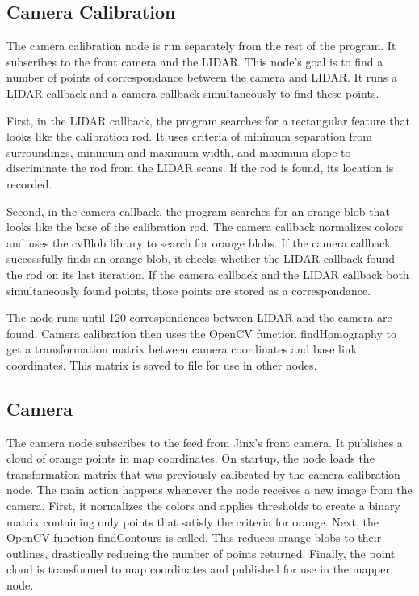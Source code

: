 \documentclass{article}
\begin{document}


\subsection{Camera Calibration}

The camera calibration node is run separately from the rest of the program.  It subscribes to the front camera and the LIDAR.  This node's goal is to find a number of points of correspondance between the camera and LIDAR.  It runs a LIDAR callback and a camera callback simultaneously to find these points.

First, in the LIDAR callback, the program searches for a rectangular feature that looks like the calibration rod.  It uses criteria of minimum separation from surroundings, minimum and maximum width, and maximum slope to discriminate the rod from the LIDAR scans.  If the rod is found, its location is recorded.

Second, in the camera callback, the program searches for an orange blob that looks like the base of the calibration rod.  The camera callback normalizes colors and uses the cvBlob library to search for orange blobs.  If the camera callback successfully finds an orange blob, it checks whether the LIDAR callback found the rod on its last iteration.  If the camera callback and the LIDAR callback both simultaneously found points, those points are stored as a correspondance.

The node runs until 120 correspondences between LIDAR and the camera are found.  Camera calibration then uses the OpenCV function findHomography to get a transformation matrix between camera coordinates and base link coordinates.  This matrix is saved to file for use in other nodes. 



\subsection{Camera}

The camera node subscribes to the feed from Jinx's front camera.  It publishes a cloud of orange points in map coordinates.  On startup, the node loads the transformation matrix that was previously calibrated by the camera calibration node.  The main action happens whenever the node receives a new image from the camera.  First, it normalizes the colors and applies thresholds to create a binary matrix containing only points that satisfy the criteria for orange.  Next, the OpenCV function findContours is called.  This reduces orange blobs to their outlines, drastically reducing the number of points returned.
Finally, the point cloud is transformed to map coordinates and published for use in the mapper node.
\end{document}
